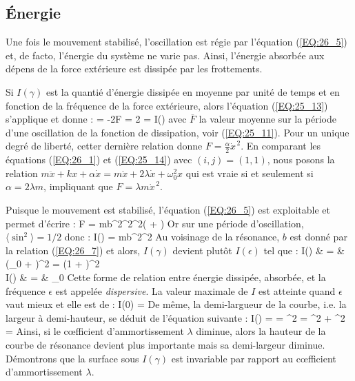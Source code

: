 \subsection{\'{E}nergie}

Une fois le mouvement stabilis\'{e}, l'oscillation est r\'{e}gie par l'\'{e}quation (\ref{EQ:26_5}) et, de facto, l'\'{e}nergie du syst\`{e}me ne varie pas. Ainsi, l'\'{e}nergie absorb\'{e}e aux d\'{e}pens de la force ext\'{e}rieure est dissip\'{e}e par les frottements.

Si $I(\gamma)$ est la quanti\'{e} d'\'{e}nergie dissip\'{e}e en moyenne par unit\'{e} de temps et en fonction de la fr\'{e}quence de la force ext\'{e}rieure, alors l'\'{e}quation (\ref{EQ:25_13}) s'applique et donne :
\benn
	 = -2F \Rightarrow {} = 2 = I(\Gamma)
\eenn
avec $\overline{F}$ la valeur moyenne sur la p\'{e}riode d'une oscillation de la fonction de dissipation, voir (\ref{EQ:25_11}). Pour un unique degr\'{e} de libert\'{e}, cetter derni\`{e}re relation donne $F = \frac{\alpha}{2}\dot{x}^{\,2}$. En comparant les \'{e}quations (\ref{EQ:26_1}) et (\ref{EQ:25_14}) avec $(i,j) = (1,1)$, nous posons la relation $m\ddot{x} + kx + \alpha\dot{x} = m\ddot{x} + 2\lambda\dot{x} + \omega_{0}^{2}x$ qui est vraie si et seulement si  $\alpha = 2\lambda m$, impliquant que $F = \lambda m\dot{x}^{\,2}$.

Puisque le mouvement est stabilis\'{e}, l'\'{e}quation (\ref{EQ:26_5}) est exploitable et permet d'\'{e}crire :
\benn
	F = \lambda mb^{2}\gamma^{2}\sin^{2}(\gamma{} + \delta)
\eenn
Or sur une p\'{e}riode d'oscillation, $\langle\sin^{2}\rangle = 1/2$ donc :
\be
	I(\gamma) = \lambda mb^{2}\gamma^{2} \label{EQ:26_8}
\ee
Au voisinage de la r\'{e}sonance, $b$ est donn\'{e} par la relation (\ref{EQ:26_7}) et alors, $I(\gamma)$ devient plut\^{o}t $I(\epsilon)$ tel que :
\bea
	I(\epsilon) & = & (\omega_{0} + \epsilon)^{2} = \left(1 + \right)^{2} \nonumber \\
	\Leftrightarrow I(\epsilon) & = & \epsilon \ll \omega_{0} \label{EQ:26_9}
\eea
Cette forme de relation entre \'{e}nergie dissip\'{e}e, absorb\'{e}e, et la fr\'{e}quence $\epsilon$ est appel\'{e}e \emph{dispersive}. La valeur maximale de $I$ est atteinte quand $\epsilon$ vaut mieux et elle est de :
\benn
	I(0) = 
\eenn
De m\^{e}me, la demi-largueur de la courbe, i.e. la largeur à demi-hauteur, se d\'{e}duit de l'\'{e}quation suivante :
\benn
	I(\epsilon) =  \Leftrightarrow {} =  \lambda^{2} = \epsilon^{2} + \lambda^{2} \Leftrightarrow \epsilon = \pm \lambda
\eenn
Ainsi, si le c{\oe}fficient d'ammortissement $\lambda$ diminue, alors la hauteur de la courbe de r\'{e}sonance devient plus importante mais sa demi-largeur diminue. D\'{e}montrons que la surface sous $I(\gamma)$ est invariable par rapport au c{\oe}fficient d'ammortissement $\lambda$.


